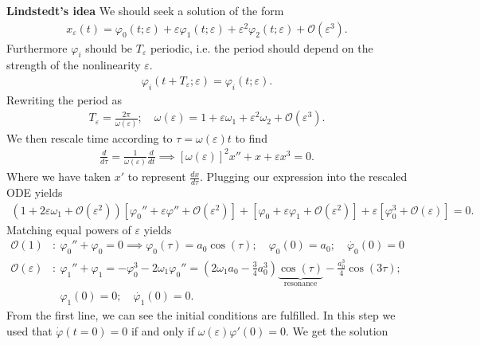 \begin{ex}
\noindent
\textbf{Lindstedt's idea} We should seek a solution of the form
\begin{align}
	x_{\varepsilon}(t) = \varphi_0(t;\varepsilon) + \varepsilon \varphi_1 (t;\varepsilon) + \varepsilon^2 \varphi_2(t;\varepsilon) + \mathcal{O}(\varepsilon^3).
\end{align}
Furthermore $\varphi_i$ should be $T_\varepsilon$ periodic, i.e. the period should depend on the strength of the  nonlinearity $\varepsilon$.
\begin{align}
	\varphi_i(t+T_\varepsilon; \varepsilon) = \varphi_i(t;\varepsilon).
\end{align}
Rewriting the period as
\begin{align}
	T_\varepsilon = \frac{2 \pi }{\omega(\varepsilon)}; \quad \omega(\varepsilon) = 1 + \varepsilon \omega_1 + \varepsilon^2 \omega_2 + \mathcal{O}(\varepsilon^3).
\end{align}
We then rescale time according to $\tau = \omega(\varepsilon) t$ to find
\begin{align}
	\frac{d}{d\tau} = \frac{1}{\omega(\varepsilon)} \frac{d}{dt} \implies 
	\boxed{[\omega(\varepsilon)]^2 x'' + x + \varepsilon x^3 = 0.}
\end{align}
Where we have taken $x'$ to represent $\frac{dx}{d\tau}$. Plugging our expression into the rescaled ODE yields
\begin{align}
	\left( 1 + 2 \varepsilon \omega_1 + \mathcal{O}(\varepsilon^2) \right) \left[ \varphi_0'' + \varepsilon \varphi'' + \mathcal{O}(\varepsilon^2) \right] + \left[ \varphi_0 + \varepsilon \varphi_1 + \mathcal{O}(\varepsilon^2) \right] + \varepsilon \left[\varphi_0^{3} + \mathcal{O}(\varepsilon) \right] = 0.
\end{align}
Matching equal powers of $\varepsilon$ yields
\begin{subequations}\begin{align}
	\mathcal{O}(1)&:\ \varphi_0'' + \varphi_0 = 0 \implies \varphi_0(\tau) = a_0 \cos(\tau);\quad \varphi_0(0)=a_0;\quad \dot{\varphi_0}(0) = 0 \\
	\mathcal{O}(\varepsilon)&:\ \varphi_1'' + \varphi_1 = - \varphi^3_0 - 2\omega_1 \varphi_{0}'' = 
	\left(2 \omega_1 a_0 - \frac{3}{4}a_0^{3}\right) \underbrace{\cos (\tau)}_{ \textrm{resonance} } - \frac{a_0^{3}}{4} \cos(3 \tau); \\
			     &\phantom{:}\ \varphi_1(0)=0; \quad \dot{\varphi_1}(0) = 0. 
\end{align}\end{subequations}
From the first line, we can see the initial conditions are fulfilled. In this step we used that $\dot{\varphi}(t=0) = 0$ if and only if $\omega(\varepsilon)\varphi '(0) = 0$. We get the solution

\end{ex}
